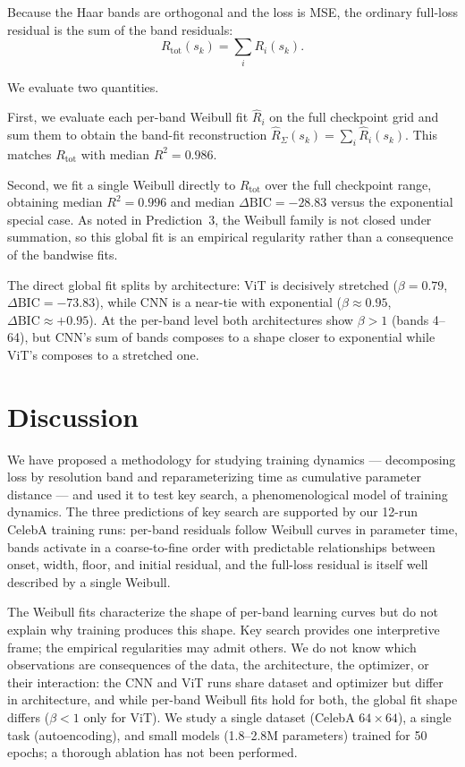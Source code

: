 \documentclass{article}
\begin{document}
Because the Haar bands are orthogonal and the loss is MSE, the
ordinary full-loss residual is the sum of the band residuals:
\[
R_{\mathrm{tot}}(s_k)=\sum_i R_i(s_k).
\]

We evaluate two quantities. 

First, we evaluate each per-band Weibull fit $\widehat R_i$ on the
full checkpoint grid and sum them to obtain the band-fit
reconstruction $\widehat R_{\Sigma}(s_k)=\sum_i \widehat R_i(s_k)$.
This matches $R_{\mathrm{tot}}$ with median $R^2=0.986$.

Second, we fit a single Weibull directly to $R_{\mathrm{tot}}$ over the
full checkpoint range, obtaining median $R^2=0.996$ and median
$\Delta\mathrm{BIC} = -28.83$ versus the exponential special case. As
noted in Prediction~3, the Weibull family is not closed under summation,
so this global fit is an empirical regularity rather than a consequence
of the bandwise fits.

The direct global fit splits by architecture: ViT is decisively
stretched ($\beta = 0.79$, $\Delta\mathrm{BIC} = -73.83$), while CNN is a
near-tie with exponential ($\beta \approx 0.95$,
$\Delta\mathrm{BIC} \approx +0.95$). At the per-band level both
architectures show $\beta > 1$ (bands 4--64), but CNN's sum of bands
composes to a shape closer to exponential while ViT's composes to a
stretched one.

\section{Discussion}\label{discussion}

We have proposed a methodology for studying training dynamics ---
decomposing loss by resolution band and reparameterizing time as
cumulative parameter distance --- and used it to test key search,
a phenomenological model of training
dynamics. The three predictions of key search are
supported by our 12-run CelebA training runs: per-band residuals follow Weibull
curves in parameter time, bands activate in a coarse-to-fine order with
predictable relationships between onset, width, floor, and initial residual,
and the full-loss residual is itself well described by a single Weibull.

The Weibull fits characterize the shape of per-band learning curves but
do not explain why training produces this shape. Key search provides one
interpretive frame; the empirical regularities may admit others. We do
not know which observations are consequences of the data, the
architecture, the optimizer, or their interaction: the CNN and ViT runs
share dataset and optimizer but differ in architecture, and while
per-band Weibull fits hold for both, the global fit shape differs
($\beta < 1$ only for ViT). We study a single dataset (CelebA
$64 \times 64$), a single task (autoencoding), and small models
(1.8--2.8M parameters) trained for 50 epochs; a thorough ablation has
not been performed.
\end{document}
